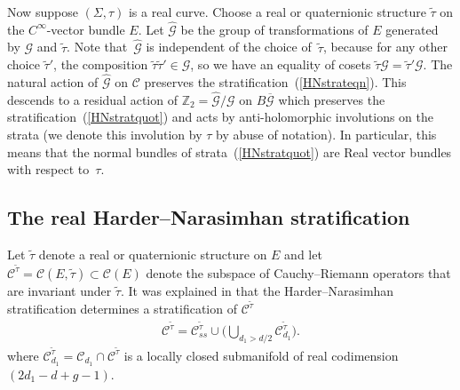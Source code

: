 \documentclass[pdftex]{sigma}
\numberwithin{equation}{section}
\begin{document}
Now suppose $(\Sigma, \tau)$ is a real curve. Choose a real or quaternionic structure $\tilde{\tau}$ on the $C^{\infty}$-vector bundle $E$. Let $\hat{{\mathcal G}}$ be the group of transformations of $E$ generated by ${\mathcal G}$ and $\tilde{\tau}$. Note that~$\hat{{\mathcal G}}$ is independent of the choice of~$\tilde{\tau}$, because for any other choice $\tilde{\tau}'$, the composition $\tilde{\tau} \tilde{\tau}' \in {\mathcal G}$, so we have an equality of cosets $\tilde{\tau} {\mathcal G} = \tilde{\tau}'{\mathcal G}$. The natural action of $\hat{{\mathcal G}}$ on ${\mathcal C}$ preserves the stratif\/ication~(\ref{HNstrateqn}). This descends to a residual action of ${\mathbb Z}_2 = \hat{{\mathcal G}}/{\mathcal G}$ on $B\overline{{\mathcal G}}$ which preserves the stratif\/ication~(\ref{HNstratquot}) and acts by anti-holomorphic involutions on the strata (we denote this involution by $\tau$ by abuse of notation). In particular, this means that the normal bundles of strata~(\ref{HNstratquot}) are Real vector bundles with respect to~$\tau$.

\subsection{The real Harder--Narasimhan stratif\/ication}\label{realstratsect}

Let $\tilde{\tau}$ denote a real or quaternionic structure on $E$ and let ${\mathcal C}^{\tilde{\tau}} ={\mathcal C}(E,\tilde{\tau}) \subset {\mathcal C}(E)$ denote the subspace of Cauchy--Riemann operators that are invariant under $\tilde{\tau}$. It was explained in \cite{B} that the Harder--Narasimhan stratif\/ication determines a stratif\/ication of ${\mathcal C}^{\tilde{\tau}}${\samepage
\begin{gather}\label{rHNstrat}
 {\mathcal C}^{\tilde{\tau}} = {\mathcal C}_{ss}^{\tilde{\tau}} \cup \bigg( \bigcup_{d_1 > d/2} {\mathcal C}_{d_1}^{\tilde{\tau}} \bigg).
 \end{gather}
where ${\mathcal C}^{\tilde{\tau}}_{d_1} = {\mathcal C}_{d_1} \cap {\mathcal C}^{\tilde{\tau}}$ is a locally closed submanifold of real codimension $(2d_1-d+g-1)$.}
\end{document}
